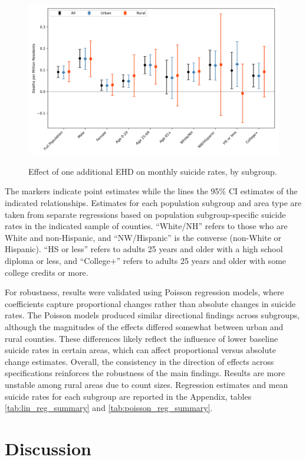 \documentclass[12pt, a4paper]{article}
\begin{document}
\begin{figure}[ht]
    \centering
    \caption{Effect of one additional EHD on monthly suicide rates, by subgroup.}
    \includegraphics[width=\textwidth]{lin_results.png}
    \label{fig:lin_results}
\end{figure}
The markers indicate point estimates while the lines the 95\% CI estimates of the indicated relationships. Estimates for each population subgroup and area type are taken from separate regressions based on population subgroup-specific suicide rates in the indicated sample of counties. “White/NH” refers to those who are White and non-Hispanic, and “NW/Hispanic” is the converse (non-White or Hispanic). “HS or less” refers to adults 25 years and older with a high school diploma or less, and “College+” refers to adults 25 years and older with some college credits or more. 

For robustness, results were validated using Poisson regression models, where coefficients capture proportional changes rather than absolute changes in suicide rates. The Poisson models produced similar directional findings across subgroups, although the magnitudes of the effects differed somewhat between urban and rural counties. These differences likely reflect the influence of lower baseline suicide rates in certain areas, which can affect proportional versus absolute change estimates. Overall, the consistency in the direction of effects across specifications reinforces the robustness of the main findings. Results are more unstable among rural areas due to count sizes. Regression estimates and mean suicide rates for each subgroup are reported in the Appendix, tables \ref{tab:lin_reg_summary} and \ref{tab:poisson_reg_summary}.


\section{Discussion}
\end{document}
